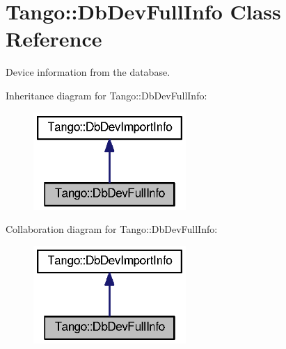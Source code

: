 \section{Tango\-:\-:Db\-Dev\-Full\-Info Class Reference}
\label{classTango_1_1DbDevFullInfo}


Device information from the database.  




Inheritance diagram for Tango\-:\-:Db\-Dev\-Full\-Info\-:
\nopagebreak
\begin{figure}[H]
\begin{center}
\leavevmode
\includegraphics[width=164pt]{d8/d2f/classTango_1_1DbDevFullInfo__inherit__graph}
\end{center}
\end{figure}


Collaboration diagram for Tango\-:\-:Db\-Dev\-Full\-Info\-:
\nopagebreak
\begin{figure}[H]
\begin{center}
\leavevmode
\includegraphics[width=164pt]{d7/d68/classTango_1_1DbDevFullInfo__coll__graph}
\end{center}
\end{figure}
